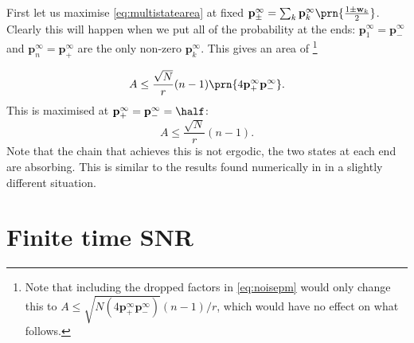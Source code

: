 \documentclass[12pt]{article}
\newcommand{\eq}{\mathbf{p}^\infty}
\newcommand{\w}{\mathbf{w}}
\begin{document}

First let us maximise \eqref{eq:multistatearea} at fixed $\eq_\pm = \sum_k \eq_k \prn{\frac{1\pm\w_k}{2}}$.
Clearly this will happen when we put all of the probability at the ends: $\eq_1=\eq_-$ and $\eq_n=\eq_+$ are the only non-zero $\eq_k$.
This gives an area of
\footnote{Note that including the dropped factors in \eqref{eq:noisepm} would only change this to $A \leq \sqrt{N(4\eq_+\eq_-)}(n-1)/r$, which would have no effect on what follows.}

%
\begin{equation}\label{eq:multistateextarea}
  A \leq \frac{\sqrt{N}}{r}(n-1)\prn{4\eq_+\eq_-}.
\end{equation}
%
This is maximised at $\eq_+=\eq_-=\half$:
%
\begin{equation}\label{eq:maxarea}
  A \leq \frac{\sqrt{N}}{r}(n-1).
\end{equation}
%
Note that the chain that achieves this is not ergodic, the two states at each end are absorbing. This is similar to the results found numerically in \cite{Barrett2008discrete} in a slightly different situation.


\section{Finite time SNR}\label{sec:finitetime}
\end{document}
